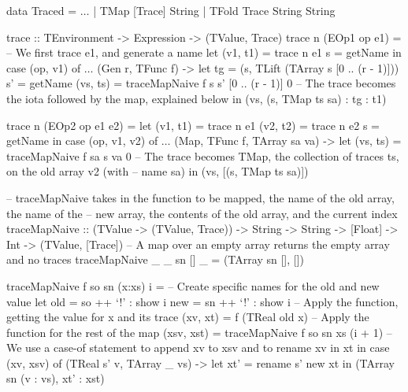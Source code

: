         \begin{haskell}[caption={Tracing generate and map while keeping arrays, naïvely}, label=lst:trace_naive, gobble=12]
            data Traced
                = $\ldots$
                | TMap  [Trace] String
                | TFold Trace   String String

            trace :: TEnvironment -> Expression -> (TValue, Trace)
            trace n (EOp1 op e1)    =
                -- We first trace e1, and generate a name
                let (v1, t1) = trace n e1
                    s = getName
                in  case (op, v1) of
                    $\ldots$
                    (Gen r, TFunc f) ->
                        let tg = (s, TLift (TArray s [0 .. (r - 1)]))
                            s' = getName
                            (vs, ts) = traceMapNaive f s s' [0 .. (r - 1)] 0
                        -- The trace becomes the iota followed by the map, explained below
                        in  (vs, (s, TMap ts sa) : tg : t1)
            
            trace n (EOp2 op e1 e2) =
                let (v1, t1) = trace n e1
                    (v2, t2) = trace n e2
                    s = getName
                in  case (op, v1, v2) of
                    $\ldots$
                    (Map, TFunc f, TArray sa va) ->
                        let (vs, ts) = traceMapNaive f sa s va 0
                        -- The trace becomes TMap, the collection of traces ts, on the old array v2 (with  
                        -- name sa)
                        in  (vs, [(s, TMap ts sa)])

            -- traceMapNaive takes in the function to be mapped, the name of the old array, the name of the 
            -- new array, the contents of the old array, and the current index
            traceMapNaive :: (TValue -> (TValue, Trace)) -> String -> String -> [Float]
                -> Int -> (TValue, [Trace])
            -- A map over an empty array returns the empty array and no traces
            traceMapNaive _ _  sn []     _ = (TArray sn [], [])

            traceMapNaive f so sn (x:xs) i =
                -- Create specific names for the old and new value
                let old = so ++ `!' : show i
                    new = sn ++ `!' : show i
                    -- Apply the function, getting the value for x and its trace
                    (xv, xt) = f (TReal old x)
                    -- Apply the function for the rest of the map
                    (xsv, xst) = traceMapNaive f so sn xs (i + 1)
                    -- We use a case-of statement to append xv to xsv and to rename xv in xt
                in  case (xv, xsv) of
                    (TReal s' v, TArray _ vs) ->
                        let xt' = rename s' new xt
                        in  (TArray sn (v : vs), xt' : xst)
        \end{haskell}

